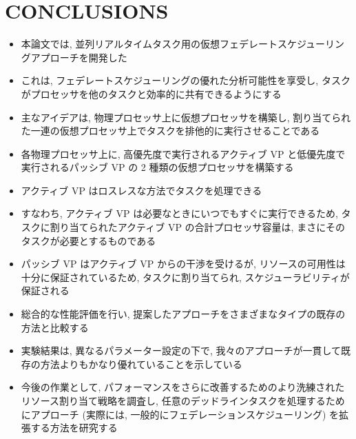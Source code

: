 
\section{CONCLUSIONS}
\label{sec: conclusions}

\begin{frame}{}
    \begin{itemize}
        \item 本論文では, 並列リアルタイムタスク用の仮想フェデレートスケジューリングアプローチを開発した
\item これは, フェデレートスケジューリングの優れた分析可能性を享受し, タスクがプロセッサを他のタスクと効率的に共有できるようにする
\item 主なアイデアは, 物理プロセッサ上に仮想プロセッサを構築し, 割り当てられた一連の仮想プロセッサ上でタスクを排他的に実行させることである
\item 各物理プロセッサ上に, 高優先度で実行されるアクティブ VP と低優先度で実行されるパッシブ VP の 2 種類の仮想プロセッサを構築する
\item アクティブ VP はロスレスな方法でタスクを処理できる
\item すなわち, アクティブ VP は必要なときにいつでもすぐに実行できるため, タスクに割り当てられたアクティブ VP の合計プロセッサ容量は, まさにそのタスクが必要とするものである
\item パッシブ VP はアクティブ VP からの干渉を受けるが, リソースの可用性は十分に保証されているため, タスクに割り当てられ, スケジューラビリティが保証される
\item 総合的な性能評価を行い, 提案したアプローチをさまざまなタイプの既存の方法と比較する
\item 実験結果は, 異なるパラメーター設定の下で, 我々のアプローチが一貫して既存の方法よりもかなり優れていることを示している
    \end{itemize}
\end{frame}

\begin{frame}{}
    \begin{itemize}
        \item 今後の作業として, パフォーマンスをさらに改善するためのより洗練されたリソース割り当て戦略を調査し, 任意のデッドラインタスクを処理するためにアプローチ (実際には, 一般的にフェデレーションスケジューリング) を拡張する方法を研究する
    \end{itemize}
\end{frame}
